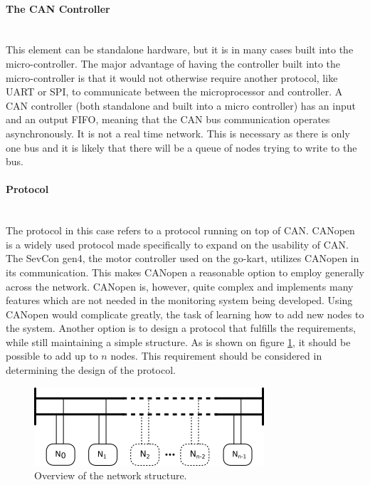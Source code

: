 
\paragraph*{The CAN Controller}~\\
This element can be standalone hardware, but it is in many cases built into the micro-controller.
The major advantage of having the controller built into the micro-controller is that it would not otherwise require another protocol, like UART or SPI, to communicate between the microprocessor and controller.
A CAN controller (both standalone and built into a micro controller) has an input and an output FIFO, meaning that the CAN bus communication operates asynchronously. 
It is not a real time network.
This is necessary as there is only one bus and it is likely that there will be a queue of nodes trying to write to the bus.

\paragraph*{Protocol}~\\
The protocol in this case refers to a protocol running on top of CAN.
CANopen is a widely used protocol made specifically to expand on the usability of CAN.
The SevCon gen4, the motor controller used on the go-kart, utilizes CANopen in its communication.
This makes CANopen a reasonable option to employ generally across the network.
CANopen is, however, quite complex and implements many features which are not needed in the monitoring system being developed.
Using CANopen would complicate greatly, the task of learning how to add new nodes to the system.
Another option is to design a protocol that fulfills the requirements,
while still maintaining a simple structure.
As is shown on figure \ref{fig:analysisnodes}, it should be possible to add up to $n$ nodes.
This requirement should be considered in determining the design of the protocol.

\begin{figure}
	\centering
	\includegraphics[width=.75\linewidth]{graphics/analysis_nodes}
	\caption{Overview of the network structure.}
	\label{fig:analysisnodes}
\end{figure}

